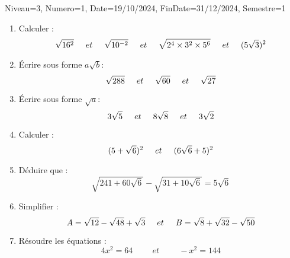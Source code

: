 \documentclass[a4paper,12pt]{article}
\begin{document}
\begin{Maquette}[DM]{Niveau=3, Numero=1, Date=19/10/2024, FinDate=31/12/2024, Semestre=1}
\begin{exercice}
\begin{enumerate}
\item Calculer :
\[ \sqrt{16^{2}} \hspace*{0.5cm} et\hspace*{0.5cm}
 \sqrt{10^{-2}} \hspace*{0.5cm}et\hspace*{0.5cm}
  \sqrt{2^{4}\times 3^{2}\times 5^{6}} \hspace*{0.5cm}et \hspace*{0.5cm}
   (5\sqrt{3})^{2}  \]
   
 \item Écrire sous forme $a\sqrt{b}$:  
 \[  \sqrt{288}\hspace*{0.5cm}et\hspace*{0.5cm}
\sqrt{60}\hspace*{0.5cm}et\hspace*{0.5cm}
\sqrt{27}   \]

\item Écrire sous forme $\sqrt{a}$:
\[  3\sqrt{5}\hspace*{0.5cm}et\hspace*{0.5cm}
8\sqrt{8}\hspace*{0.5cm}et\hspace*{0.5cm}
3\sqrt{2}   \]

\item Calculer :
\[   (5+\sqrt{6})^{2}\hspace*{0.5cm}et\hspace*{0.5cm}
	(6\sqrt{6}+5)^{2}  \]
	
\item Déduire que :
\[  \sqrt{241+60\sqrt{6}}-\sqrt{31+10\sqrt{6}}=5\sqrt{6}  \]

\item Simplifier :
\[
A=\sqrt{12}-\sqrt{48}+\sqrt{3}
\hspace*{0.5cm}et\hspace*{0.5cm}
B=\sqrt{8}+\sqrt{32}-\sqrt{50}
\]

\item Résoudre les équations :
\[
4x^{2}=64
\hspace{1cm}et\hspace{1cm}
-x^{2}=144
\]	
\end{enumerate}

\end{exercice}


\end{Maquette}
\end{document}
